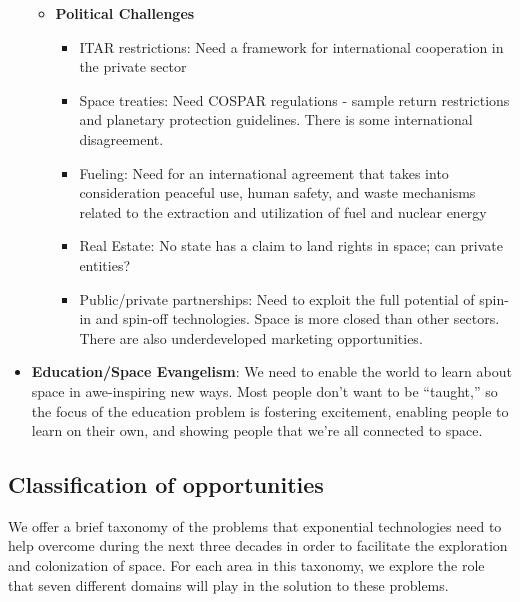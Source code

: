 \documentclass[letter,11pt]{article}
\begin{document}
\begin{itemize}
\begin{itemize}
			\item \textbf{Political Challenges} \begin{itemize}
					\item ITAR restrictions: Need a framework for international cooperation in the private sector
					\item Space treaties:  Need COSPAR regulations - sample return restrictions and planetary protection guidelines. There is some international disagreement.
					\item Fueling: Need for an international agreement that takes into consideration peaceful use, human safety, and waste mechanisms related to the extraction and utilization of fuel and nuclear energy
					\item Real Estate: No state has a claim to land rights in space; can private entities?
					\item Public/private partnerships: Need to exploit the full potential of spin-in and spin-off technologies. Space is more closed than other sectors. There are also underdeveloped marketing opportunities.
				\end{itemize}
		\end{itemize}
	\item \textbf{Education/Space Evangelism}: We need to enable the world to learn about space in awe-inspiring new ways. Most people don't want to be ``taught,'' so the focus of the education problem is fostering excitement, enabling people to learn on their own, and showing people that we're all connected to space.
\end{itemize}



\subsection{Classification of opportunities}

We offer a brief taxonomy of the problems that exponential technologies
need to help overcome during the next three decades in order to
facilitate the exploration and colonization of space. For each area in
this taxonomy, we explore the role that seven different domains  will play in the solution
to these problems.
\end{document}
